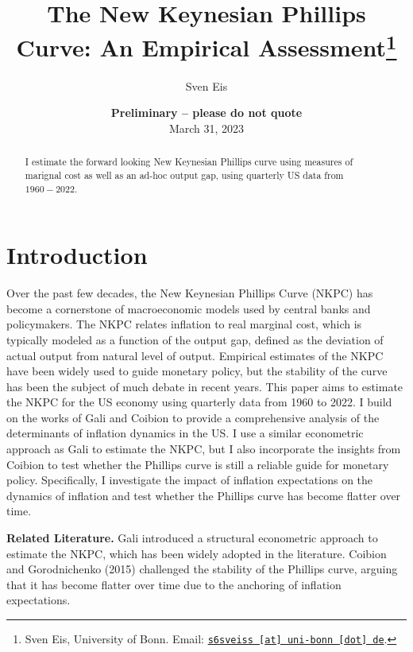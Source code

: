 \documentclass[11pt, a4paper, leqno]{article}
\begin{document}
\title{The New Keynesian Phillips Curve: An Empirical Assessment\thanks{Sven Eis, University of Bonn. Email: \href{mailto:s6sveiss@uni-bonn.de}{\nolinkurl{s6sveiss [at] uni-bonn [dot] de}}.}}

\author{Sven Eis}

\date{
    {\bf Preliminary -- please do not quote}
    \\[1ex]
    March 31, 2023
}

\maketitle


\begin{abstract}
    I estimate the forward looking New Keynesian Phillips curve using measures of marignal cost as well as an ad-hoc output gap, using quarterly US data from $1960-2022$.
\end{abstract}

\clearpage


\section{Introduction} %
Over the past few decades, the New Keynesian Phillips Curve (NKPC) has become a cornerstone of macroeconomic models used by central banks and policymakers. The NKPC relates inflation to real marginal cost, which is typically modeled as a function of the output gap, defined as the deviation of actual output from natural level of output. Empirical estimates of the NKPC have been widely used to guide monetary policy, but the stability of the curve has been the subject of much debate in recent years.
This paper aims to estimate the NKPC for the US economy using quarterly data from 1960 to 2022. I build on the works of Gali and Coibion to provide a comprehensive analysis of the determinants of inflation dynamics in the US.
I use a similar econometric approach as Gali to estimate the NKPC, but I also incorporate the insights from Coibion to test whether the Phillips curve is still a reliable guide for monetary policy. Specifically, I investigate the impact of inflation expectations on the dynamics of inflation and test whether the Phillips curve has become flatter over time.

\textbf{Related Literature.} Gali introduced a structural econometric approach to estimate the NKPC, which has been widely adopted in the literature. Coibion and Gorodnichenko (2015) challenged the stability of the Phillips curve, arguing that it has become flatter over time due to the anchoring of inflation expectations.
\end{document}
